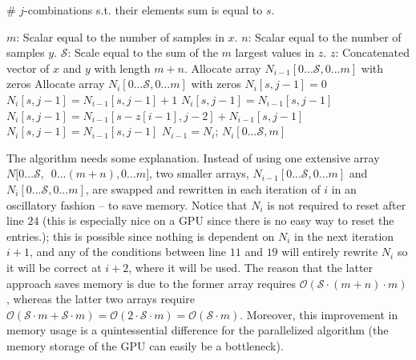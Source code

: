 \documentclass[a4paper]{article}
\begin{document}
\FloatBarrier
\begin{algorithm}
\caption{\# $j$-combinations s.t. their elements sum is equal to $s$.}
\label{alg:combination}
\begin{algorithmic}[1]
\State $m$: Scalar equal to the number of samples in $x$.
\State $n$: Scalar equal to the number of samples $y$.
\State $\mathcal{S}$: Scale equal to the sum of the $m$ largest values in $z$.
\State $z$: Concatenated vector of $x$ and $y$ with length $m+n$.
    \State Allocate array $N_{i-1}[0...\mathcal{S},0...m]$ with zeros 
    \State Allocate array $N_{i}[0...\mathcal{S},0...m]$ with zeros
                  \State $N_{i}[s,j-1]=0$ 
                  \State $N_{i}[s,j-1]=N_{i-1}[s,j-1] + 1$
                 \State $N_{i}[s,j-1]=N_{i-1}[s,j-1]$ 
                  \State $N_{i}[s,j-1]=N_{i-1}[s-z[i-1],j-2] + N_{i-1}[s,j-1]$ 
                 \State $N_{i}[s,j-1]=N_{i-1}[s,j-1]$
                \EndIf
            \EndFor
        \EndFor
        \State $N_{i-1} = N_{i}$; 
    \EndFor
        \State \Return $N_{i}[0...\mathcal{S},m]$ 
        
    \EndProcedure
\end{algorithmic}
\end{algorithm}
\FloatBarrier
The algorithm needs some explanation. Instead of using one extensive array $N[0\ldots \mathcal{S},$\ $0\ldots(m+n),0\ldots m]$, two smaller arrays, $N_{i-1}[0...\mathcal{S},0...m]$ and $N_{i}[0...\mathcal{S},0...m]$, are swapped and rewritten in each iteration of $i$ in an oscillatory fashion – to save memory. Notice that $N_{i}$ is not required to reset after line $24$ (this is especially nice on a GPU since there is no easy way to reset the entries.); this is possible since nothing is dependent on $N_{i}$ in the next iteration $i+1$, and any of the conditions between line $11$ and $19$ will entirely rewrite $N_{i}$ so it will be correct at $i+2$, where it will be used. 
The reason that the latter approach saves memory is due to the former array requires $\mathcal{O}(\mathcal{S} \cdot (m+n) \cdot m)$, whereas the latter two arrays require $\mathcal{O}(\mathcal{S} \cdot m + \mathcal{S} \cdot m) = \mathcal{O}( 2 \cdot \mathcal{S} \cdot m)=\mathcal{O}(\mathcal{S} \cdot m)$. Moreover, this improvement in memory usage is a quintessential difference for the parallelized algorithm (the memory storage of the GPU can easily be a bottleneck). 
\end{document}
